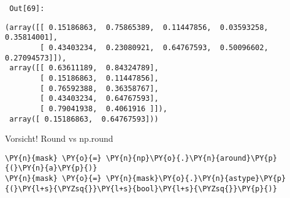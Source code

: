         {\par%
        \vspace{-1\smallerfontscale}%
        \noindent%
        \begin{minipage}{\cellleftmargin}%
    \hfill%
    {\smaller%
    \tt%
    \color{nbframe-out-prompt}%
    Out[69]:}%
    \hspace{\inputpadding}%
    \hspace{0em}%
    \hspace{3pt}%
    \end{minipage}%
        }%
    \begin{addmargin}[\cellleftmargin]{0em}%
    {\smaller%
    \vspace{-1\smallerfontscale}%
    
    
    
    \begin{verbatim}
(array([[ 0.15186863,  0.75865389,  0.11447856,  0.03593258,  0.35814001],
        [ 0.43403234,  0.23080921,  0.64767593,  0.50096602,  0.27094573]]),
 array([[ 0.63611189,  0.84324789],
        [ 0.15186863,  0.11447856],
        [ 0.76592388,  0.36358767],
        [ 0.43403234,  0.64767593],
        [ 0.79041938,  0.4061916 ]]),
 array([ 0.15186863,  0.64767593]))
    \end{verbatim}

    
}%
    \end{addmargin}%
    Vorsicht! Round vs np.round


{\par%
\vspace{-1\baselineskip}%
}%
\begin{notebookcell}[70]%
\begin{addmargin}[\cellleftmargin]{0em}%
{\smaller%
\par%
%
\vspace{-1\smallerfontscale}%
\begin{Verbatim}[commandchars=\\\{\}]
\PY{n}{mask} \PY{o}{=} \PY{n}{np}\PY{o}{.}\PY{n}{around}\PY{p}{(}\PY{n}{a}\PY{p}{)}
\PY{n}{mask} \PY{o}{=} \PY{n}{mask}\PY{o}{.}\PY{n}{astype}\PY{p}{(}\PY{l+s}{\PYZsq{}}\PY{l+s}{bool}\PY{l+s}{\PYZsq{}}\PY{p}{)}
\end{Verbatim}
%
\par%
\vspace{-1\smallerfontscale}}%
\end{addmargin}
\end{notebookcell}


